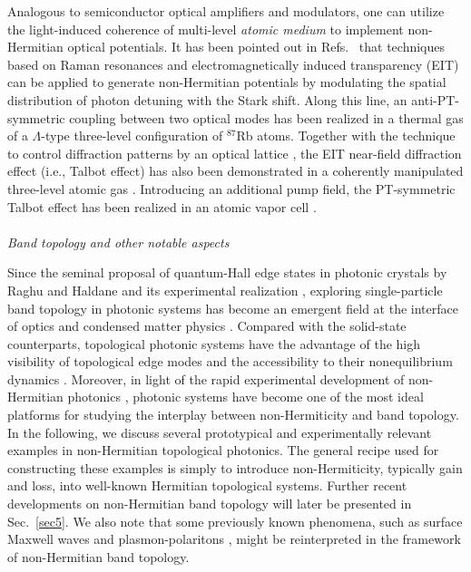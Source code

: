 \documentclass{tADP2e}
\theoremstyle{plain}
\theoremstyle{plain}
\theoremstyle{definition}
\begin{document}
\vspace{3pt}
\noindent Analogous to semiconductor optical amplifiers and modulators, one can  utilize the light-induced  coherence of multi-level {\it atomic medium} to implement non-Hermitian optical potentials. It has been pointed out in Refs.~\cite{GBJ95,SJ112} that techniques based on Raman resonances and electromagnetically induced transparency (EIT) can be applied to generate non-Hermitian potentials by modulating the spatial distribution of photon detuning with the Stark shift. Along this line, an anti-PT-symmetric coupling between two optical modes has been realized in a thermal gas of a $\Lambda$-type three-level configuration of $^{87}$Rb atoms. Together with the technique to control diffraction patterns by an optical lattice \cite{JS15}, the EIT near-field diffraction effect (i.e., Talbot effect) has also been demonstrated in a coherently manipulated three-level atomic gas \cite{WJ112}. Introducing an additional pump field, the PT-symmetric Talbot effect has been  realized in an atomic vapor cell \cite{RH12}.
\\
\\
{\it Band topology and other notable aspects}

\vspace{3pt}
\noindent Since the seminal proposal of quantum-Hall edge states in photonic crystals by Raghu and Haldane \cite{HFDM08,RS08} and its experimental realization \cite{WZ08,WZ09}, exploring single-particle band topology in photonic systems has become an emergent field at the interface of optics and condensed matter physics \cite{LL14,KAB17}. Compared with the solid-state counterparts, topological photonic systems have the advantage of the high visibility of topological edge modes and the accessibility to their nonequilibrium dynamics \cite{KF12,MH13,MCR13}. Moreover, in light of the rapid experimental development of non-Hermitian photonics \cite{MH17}, photonic systems have become one of the most ideal platforms for studying the interplay between non-Hermiticity and band topology. In the following, we discuss several prototypical and experimentally relevant examples in non-Hermitian topological photonics. The general recipe used for constructing these examples is simply to introduce non-Hermiticity, typically gain and loss, into well-known Hermitian topological systems. Further recent developments on non-Hermitian band topology will later be presented in Sec.~\ref{sec5}. We also note that some previously known phenomena, such as surface Maxwell waves \cite{KYB19} and plasmon-polaritons \cite{BKY19}, might be reinterpreted in the framework of non-Hermitian band topology.
\end{document}
